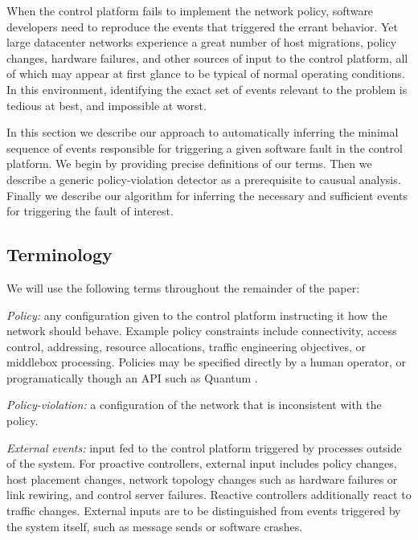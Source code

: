 When the control platform fails to implement the network policy, software
developers need to reproduce the events that triggered the errant behavior.
Yet large datacenter networks experience a great number of host migrations,
policy changes, hardware failures, and other sources of input to the control
platform, all of which may appear at first glance to be typical of normal operating
conditions. In this environment, identifying the exact set of events relevant
to the problem is tedious at best, and impossible at worst.

In this section we describe our approach to automatically inferring the minimal
sequence of events responsible for triggering a given software fault in the
control platform. We begin by providing precise definitions of our terms. Then we
describe a generic policy-violation detector as a prerequisite to causual analysis.
Finally we describe our algorithm for inferring the necessary and sufficient events
for triggering the fault of interest.

\subsection{Terminology}

We will use the following terms throughout the remainder of the paper:


{\em Policy:} any configuration given to the control platform instructing it
how the network should behave. Example policy constraints include connectivity, access
control, addressing, resource allocations, traffic engineering objectives,
or middlebox processing. Policies may be specified directly by a human operator, or
programatically though an API such as Quantum \cite{quantum}. 

{\em Policy-violation:} a configuration of the network that is inconsistent
with the policy.

{\em External events:} input fed to the control platform triggered by processes outside
of the system. For proactive controllers, external input includes policy
changes, host placement changes, network topology changes such as hardware
failures or link rewiring, and control server failures. Reactive controllers
additionally react to traffic changes. External inputs are to be distinguished
from events triggered by the system itself, such as message sends or software
crashes.

